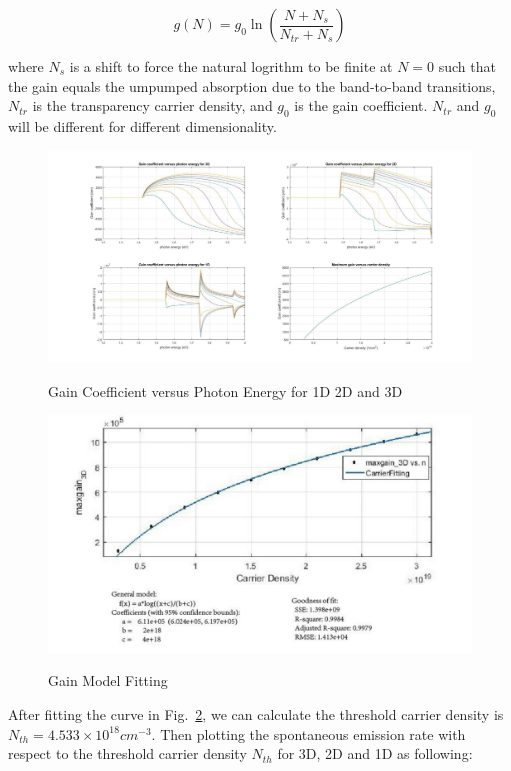 \begin{equation}
  g(N) = g_0\ln\left(\frac{N+N_s}{N_{tr}+ N_s}\right)
\end{equation}

where $N_s$ is a shift to force the natural logrithm to be finite at $N = 0$
such that the gain equals the umpumped absorption due to the band-to-band
transitions, $N_{tr}$ is the transparency carrier density, and $g_0$ is the
gain coefficient. $N_{tr}$ and $g_0$ will be different for different
dimensionality.

\begin{figure}
  \caption{Gain Coefficient versus Photon Energy for 1D 2D and 3D}
  \centering
  \includegraphics[width=\textwidth]{pictures/LT/gainspectrum}
  \label{gainspectrum}
\end{figure}

\begin{figure}
  \caption{Gain Model Fitting}
  \centering
  \includegraphics[width=\textwidth]{pictures/LT/gainModelFit_Anoted}
  \label{gainModelFit_Anoted}
\end{figure}

After fitting the curve in Fig.~\ref{gainModelFit_Anoted}, we can calculate the
threshold carrier density is $N_{th} = 4.533\times10^{18} cm^{-3}$. Then
plotting the spontaneous emission rate with respect to the threshold carrier
density $N_{th}$ for 3D, 2D and 1D as following: 

